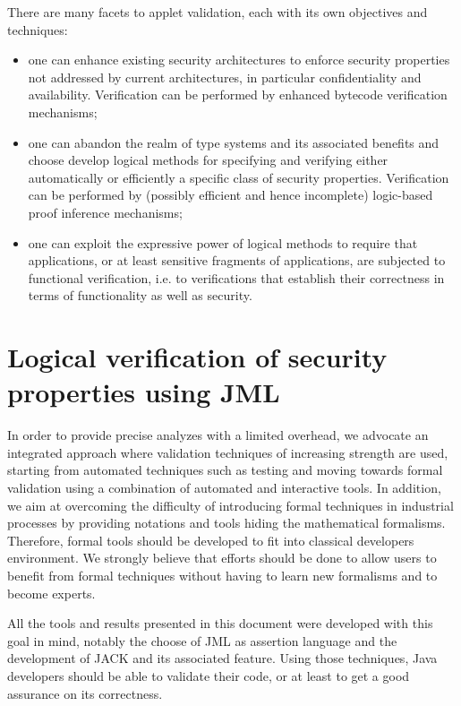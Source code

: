 There are many facets to applet validation, each with its own
objectives and techniques:
\begin{itemize}
\item one can enhance existing security architectures to enforce
security properties not addressed by current architectures, in
particular confidentiality and availability.  Verification can be
performed by enhanced bytecode verification mechanisms;


\item one can abandon the realm of type systems and its associated
benefits and choose develop logical methods for specifying and
verifying either automatically or efficiently a specific class of
security properties. Verification can be performed by (possibly
efficient and hence incomplete) logic-based proof inference
mechanisms;




\item one can exploit the expressive power of logical methods to
require that applications, or at least sensitive fragments of
applications, are subjected to functional verification, i.e. to
verifications that establish their correctness in terms of
functionality as well as security.
\end{itemize}


\section{Logical verification of security properties using JML}
In order to provide precise analyzes with a limited overhead, we
advocate an integrated approach where validation techniques of
increasing strength are used, starting from automated techniques such
as testing and moving towards formal validation using a combination of
automated and interactive tools. In addition, we aim at overcoming the
difficulty of introducing formal techniques in industrial processes by
providing notations and tools hiding the mathematical formalisms.
Therefore, formal tools should be developed to fit into classical
developers environment.  We strongly believe that efforts should be
done to allow users to benefit from formal techniques without having
to learn new formalisms and to become experts.

All the tools and results presented in this document were developed
with this goal in mind, notably the choose of JML as assertion
language and the development of JACK and its associated feature.
Using those techniques, Java developers should be able to validate
their code, or at least to get a good assurance on its correctness.


